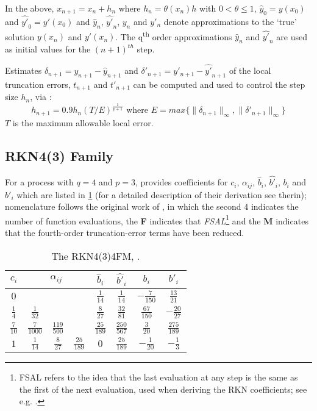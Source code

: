 In the above, \( x_{n+1} = x_n + h_n\) where \( h_n = \theta (x_n) h\) with 
\( 0< \theta \leq 1 \), \( \hat{y}_0 = y(x_0) \) and \( \hat{y'}_0 = y'(x_0)\) 
and \( \hat{y}_n \), \(\hat{y'}_n\), \(y_n\) and \(y'_n\) denote approximations to the 
`true' solution \(y(x_n)\) and \(y'(x_n)\). The q\textsuperscript{th} order approximations 
\( \hat{y}_n \) and \( \hat{y'}_n\) are used as initial values for the \( (n+1)^{th} \) 
step.

Estimates \({\delta}_{n+1} = y_{n+1} - \hat{y}_{n+1}\) and \({\delta '}_{n+1} = y'_{n+1} - \hat{y'}_{n+1}\) 
of the local truncation errors, \(t_{n+1}\) and \(t'_{n+1}\) can be computed and used 
to control the step size \(h_n\), via \cite{dormand87}:
\begin{equation}
  h_{n+1} = 0.9 h_n (T/E)^{\frac{1}{p+1}} \text{ where } 
  E = max\{\lVert {\delta}_{n+1} \rVert_{\infty} , \lVert {\delta '}_{n+1} \rVert_{\infty} \}
\end{equation}
\(T\) is the maximum allowable local error.

\subsection{RKN4(3) Family}
For a process with \(q=4\) and \(p=3\), \cite{dormand87} provides coefficients for \(c_i\), \({\alpha}_{ij}\), 
\(\hat{b}_i\), \(\hat{b'}_i\), \(b_i\) and \(b'_i\) which are listed in \ref{table:dormand87-rkn434fm} 
(for a detailed description of their derivation see therin); nomenclature follows the 
original work of \cite{dormand86}, in which the second \(4\) indicates the number of function 
evaluations, the \textbf{F} indicates that \emph{FSAL}\footnote{FSAL refers to the idea that 
the last evaluation at any step is the same as the first of the next evaluation, used when 
deriving the RKN coefficients; see e.g. \cite{dormand78}.} and the \textbf{M} indicates that the fourth-order truncation-error terms have
been reduced.

\renewcommand{\arraystretch}{2}
\begin{table}[h!]
    \centering
    \begin{tabular}{cccccccc}
        \hline
        \(c_i\) & \multicolumn{3}{c}{\({\alpha}_{ij}\)} &  \(\hat{b}_i\) & \(\hat{b'}_i\) & \(b_i\) & \(b'_i\) \\
        \hline
        \(0\) & & & & \(\frac{1}{14}\) & \(\frac{1}{14}\) & \(-\frac{7}{150}\) & \(\frac{13}{21}\) \\
        \(\frac{1}{4}\) & \(\frac{1}{32}\) & & & \(\frac{8}{27}\) & \(\frac{32}{81}\) & \(\frac{67}{150}\) & \(-\frac{20}{27}\) \\
        \(\frac{7}{10}\) & \(\frac{7}{1000}\) & \(\frac{119}{500}\) & & \(\frac{25}{189}\) & \(\frac{250}{567}\) & \(\frac{3}{20}\) & \(\frac{275}{189}\) \\
        \(1\) & \(\frac{1}{14}\) & \(\frac{8}{27}\) & \(\frac{25}{189}\) & \(0\) & \(\frac{25}{189}\) & \(-\frac{1}{20}\) & \(-\frac{1}{3}\) \\
        \hline
    \end{tabular}
    \caption{The RKN4(3)4FM, \cite{dormand87}.}
    \label{table:dormand87-rkn434fm}
\end{table}
\renewcommand{\arraystretch}{1}

